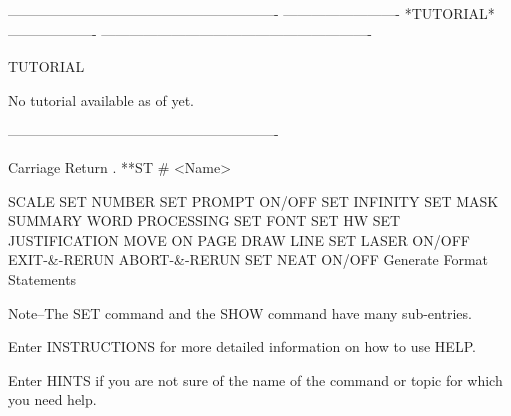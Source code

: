  
 
 
 
 
 
 
 
 
 
 
 
 
 
 
 
 
 
----------------------------------------------------------
-------------------------  *TUTORIAL*  -------------------
----------------------------------------------------------
 
TUTORIAL
 
No tutorial available as of yet.
 
----------------------------------------------------------
 
      Carriage Return     .        **ST      #       <Name>
 
      SCALE
      SET NUMBER
SET PROMPT ON/OFF
SET INFINITY
SET MASK
SUMMARY
WORD PROCESSING
SET FONT
SET HW
SET JUSTIFICATION
MOVE ON PAGE
DRAW LINE
SET LASER ON/OFF
EXIT-&-RERUN
ABORT-&-RERUN
SET NEAT ON/OFF
Generate Format Statements
 
   Note--The SET command and the SHOW command
          have many sub-entries.
 
   Enter INSTRUCTIONS for more detailed information
   on how to use HELP.
 
   Enter HINTS if you are not sure of the name
   of the command or topic for which you need help.
 
 
 
 
 
 
 
 
 
 
 
 
 
 
 
 
 
 
 
 
 
 
 
 
 
 
 
 
 
 
 
 
 
 
 
 
 
 
 
 
 
 
 
 
 
 
 
